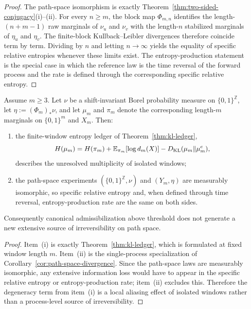 \begin{proof}
The path-space isomorphism is exactly Theorem~\ref{thm:two-sided-conjugacy}(i)--(ii). For every $n\ge m$, the block map $\Phi_{m,n}$ identifies the length-$(n+m-1)$ raw marginals of $\nu_u$ and $\nu_v$ with the length-$n$ stabilized marginals of $\eta_u$ and $\eta_v$. The finite-block Kullback--Leibler divergences therefore coincide term by term. Dividing by $n$ and letting $n\to\infty$ yields the equality of specific relative entropies whenever these limits exist. The entropy-production statement is the special case in which the reference law is the time reversal of the forward process and the rate is defined through the corresponding specific relative entropy.
\end{proof}

\begin{proposition}\label{prop:irreversibility-localization}
Assume $m\ge 3$. Let $\nu$ be a shift-invariant Borel probability measure on $\{0,1\}^{\mathbb Z}$, let $\eta:=(\Phi_m)_*\nu$, and let $\mu_m$ and $\pi_m$ denote the corresponding length-$m$ marginals on $\{0,1\}^m$ and $X_m$. Then:
\begin{enumerate}[label=(\roman*),leftmargin=*,itemsep=2pt]
  \item the finite-window entropy ledger of Theorem~\ref{thm:kl-ledger},
  \[
  H(\mu_m)=H(\pi_m)+\mathbb{E}_{\pi_m}[\log d_m(X)]-D_{\mathrm{KL}}(\mu_m\|\mu_m^e),
  \]
  describes the unresolved multiplicity of isolated windows;
  \item the path-space experiments $(\{0,1\}^{\mathbb Z},\nu)$ and $(Y_m,\eta)$ are measurably isomorphic, so specific relative entropy and, when defined through time reversal, entropy-production rate are the same on both sides.
\end{enumerate}
Consequently canonical admissibilization above threshold does not generate a new extensive source of irreversibility on path space.
\end{proposition}

\begin{proof}
Item~(i) is exactly Theorem~\ref{thm:kl-ledger}, which is formulated at fixed window length $m$. Item~(ii) is the single-process specialization of Corollary~\ref{cor:path-space-divergence}. Since the path-space laws are measurably isomorphic, any extensive information loss would have to appear in the specific relative entropy or entropy-production rate; item~(ii) excludes this. Therefore the degeneracy term from item~(i) is a local aliasing effect of isolated windows rather than a process-level source of irreversibility.
\end{proof}

